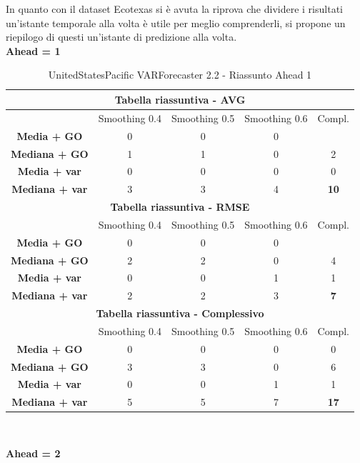 \documentclass[12pt,a4paper,oneside,openright]{book}
\begin{document}
In quanto con il dataset Ecotexas si è avuta la riprova che dividere i risultati un'istante temporale alla volta è utile per meglio comprenderli, si propone un riepilogo di questi un'istante di predizione alla volta.\\

\newpage
\textbf{Ahead = 1}

\medskip

\begin{table}[H]
\centering
\begin{tabular}{|c|c|c|c|c|}
\hline
\multicolumn{5}{|c|}{\textbf{Tabella riassuntiva - AVG}} \\
\hline
& Smoothing 0.4 & Smoothing 0.5 & Smoothing 0.6 & Compl.\\
\hline
\textbf{Media + GO} & 0 & 0 & 0 & \\ 
\hline
\textbf{Mediana + GO} & 1 & 1 & 0 & 2\\ 
\hline
\textbf{Media + var} & 0 & 0 & 0 & 0\\ 
\hline
\textbf{Mediana + var} & 3 & 3 & 4 & \textbf{10}\\ 
\hline
\multicolumn{5}{|c|}{\textbf{Tabella riassuntiva - RMSE}} \\
\hline
& Smoothing 0.4 & Smoothing 0.5 & Smoothing 0.6 & Compl.\\
\hline
\textbf{Media + GO} & 0 & 0 & 0 & \\ 
\hline
\textbf{Mediana + GO} & 2 & 2 & 0 & 4\\ 
\hline
\textbf{Media + var} & 0 & 0 & 1 & 1\\ 
\hline
\textbf{Mediana + var} & 2 & 2 & 3 & \textbf{7}\\ 
\hline
\multicolumn{5}{|c|}{\textbf{Tabella riassuntiva - Complessivo}} \\
\hline
& Smoothing 0.4 & Smoothing 0.5 & Smoothing 0.6 & Compl.\\
\hline
\textbf{Media + GO} & 0 & 0 & 0 & 0\\ 
\hline
\textbf{Mediana + GO} & 3 & 3 & 0 & 6\\ 
\hline
\textbf{Media + var} & 0 & 0 & 1 & 1 \\ 
\hline
\textbf{Mediana + var} & 5 & 5 & 7 & \textbf{17}\\ 
\hline
\end{tabular} \\ 
\caption{UnitedStatesPacific VARForecaster 2.2 - Riassunto Ahead 1}
\end{table}

\newpage

\textbf{Ahead = 2}
\end{document}
